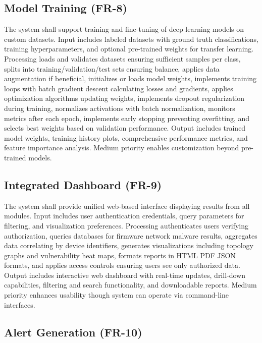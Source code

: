 \subsection{Model Training (FR-8)}

The system shall support training and fine-tuning of deep learning models on custom datasets. Input includes labeled datasets with ground truth classifications, training hyperparameters, and optional pre-trained weights for transfer learning. Processing loads and validates datasets ensuring sufficient samples per class, splits into training/validation/test sets ensuring balance, applies data augmentation if beneficial, initializes or loads model weights, implements training loops with batch gradient descent calculating losses and gradients, applies optimization algorithms updating weights, implements dropout regularization during training, normalizes activations with batch normalization, monitors metrics after each epoch, implements early stopping preventing overfitting, and selects best weights based on validation performance. Output includes trained model weights, training history plots, comprehensive performance metrics, and feature importance analysis. Medium priority enables customization beyond pre-trained models.

\subsection{Integrated Dashboard (FR-9)}

The system shall provide unified web-based interface displaying results from all modules. Input includes user authentication credentials, query parameters for filtering, and visualization preferences. Processing authenticates users verifying authorization, queries databases for firmware network malware results, aggregates data correlating by device identifiers, generates visualizations including topology graphs and vulnerability heat maps, formats reports in HTML  PDF JSON formats, and applies access controls ensuring users see only authorized data. Output includes interactive web dashboard with real-time updates, drill-down capabilities, filtering and search functionality, and downloadable reports. Medium priority enhances usability though system can operate via command-line interfaces.

\subsection{Alert Generation (FR-10)}

